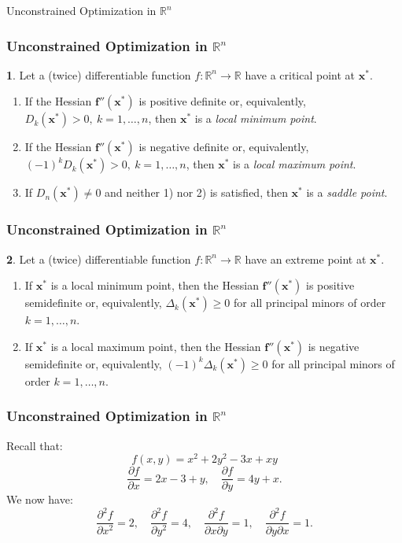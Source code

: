 \documentclass[10pt]{beamer}
\theoremstyle{definition}
\newtheorem{Fact}{\translate{Fact}}
\begin{document}
\begin{section}{Unconstrained Optimization in $ \mathbb{R}^n $}
\begin{frame}[fragile]
\frametitle{Unconstrained Optimization in $ \mathbb{R}^n $}
\begin{Fact}
Let a (twice) differentiable function $ f: \mathbb{R}^n \rightarrow \mathbb{R} $ have a critical point at $ \mathbf{x^*} $.
\begin{enumerate}
\item If the Hessian  $ \mathbf{f''(x^*)} $ is positive definite or, equivalently, $ D_k(\mathbf{x^*})>0,~k=1,\ldots,n $, then $ \mathbf{x^*} $ is a \emph{local minimum point}.
\item If the Hessian  $ \mathbf{f''(x^*)} $ is negative definite or, equivalently, $ (-1)^k D_k(\mathbf{x^*})>0,~k=1,\ldots,n $, then $ \mathbf{x^*} $ is a \emph{local maximum point}.
\item If $ D_n(\mathbf{x^*})\neq 0 $ and neither 1) nor 2) is satisfied, then $ \mathbf{x^*} $ is a \emph{saddle point}.
\end{enumerate}
\label{fc:ScsRn}
\end{Fact}
\end{frame}

\begin{frame}[fragile]
\frametitle{Unconstrained Optimization in $ \mathbb{R}^n $}
\begin{Fact}
Let a (twice) differentiable function $ f: \mathbb{R}^n \rightarrow \mathbb{R} $ have an extreme point at $ \mathbf{x^*} $.
\begin{enumerate}
\item If $ \mathbf{x^*} $ is a local minimum point, then the Hessian  $ \mathbf{f''(x^*)} $ is positive semidefinite or, equivalently, $ \Delta_k(\mathbf{x^*})\geq 0$ for all principal minors of order $ k=1,\ldots,n $.
\item If $ \mathbf{x^*} $ is a local maximum point, then the Hessian  $ \mathbf{f''(x^*)} $ is negative semidefinite or, equivalently, $ (-1)^k \Delta_k(\mathbf{x^*})\geq 0$ for all principal minors of order $ k=1,\ldots,n $.
\end{enumerate}
\label{fc:NcsRn}
\end{Fact}
\end{frame}

\begin{frame}[fragile]
\frametitle{Unconstrained Optimization in $ \mathbb{R}^n $}
\begin{example} Recall that:
\[ f(x,y) = x^2 +2y^2-3x+xy \]
\[ \frac{\partial f}{\partial x} = 2x-3+y,\quad \frac{\partial f}{\partial y} = 4y+x.\]
We now have:
\[ \frac{\partial^2 f}{\partial x^2} = 2, \quad \frac{\partial^2 f}{\partial y^2} = 4,\quad \frac{\partial^2 f}{\partial x \partial y} = 1, \quad  \frac{\partial^2 f}{\partial y \partial x } = 1. \]


\end{example}
\end{frame}
\end{section}
\end{document}
